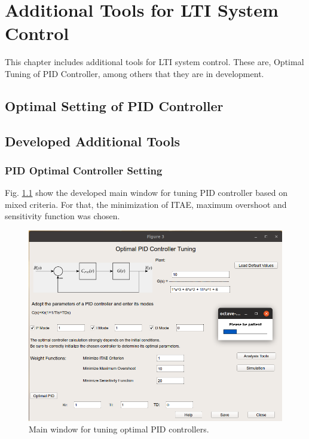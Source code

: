\chapter{Additional Tools for LTI System Control} \label{additool_chapter}


This chapter includes additional tools for LTI system control. These are, Optimal Tuning of  PID Controller, among others that they are in development.

\section{Optimal Setting of PID Controller}

\section{Developed Additional Tools}

\subsection{PID Optimal Controller Setting}

Fig. \ref{chpADDITOOL_fig01_ejemOptimalPID} show the developed main window for tuning PID controller based on mixed criteria. For that, the minimization of ITAE, maximum overshoot and sensitivity function was chosen.


\begin{figure}[H]
	\centering
	\includegraphics[scale=0.5]{./figuras/chapter_additools/fig01EjemAdditools.png}
	\caption{Main window for tuning optimal PID controllers.}
	\label{chpADDITOOL_fig01_ejemOptimalPID}
\end{figure}

